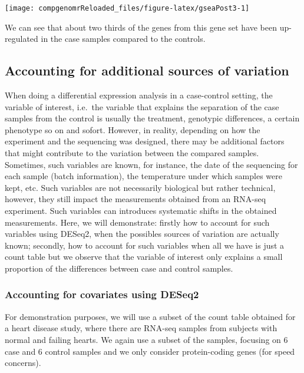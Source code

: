 \documentclass[12pt,]{krantz}
\begin{document}
\begin{center}\texttt{[image: compgenomrReloaded\_files/figure-latex/gseaPost3-1]} \end{center}

We can see that about two thirds of the genes from this gene set have been up-regulated in the case samples
compared to the controls.

\hypertarget{accounting-for-additional-sources-of-variation}{%
\subsection{Accounting for additional sources of variation}\label{accounting-for-additional-sources-of-variation}}

When doing a differential expression analysis in a case-control setting, the variable of interest, i.e.~the variable that explains the separation of the case samples from the control is usually the treatment, genotypic differences, a certain phenotype so on and sofort. However, in reality, depending on how the experiment and the sequencing was designed, there may be additional factors that might contribute to the variation between the compared samples. Sometimes, such variables are known, for instance, the date of the sequencing for each sample (batch information), the temperature under which samples were kept, etc. Such variables are not necessarily biological but rather technical, however, they still impact the measurements obtained from an RNA-seq experiment. Such variables can introduces systematic shifts in the obtained measurements. Here, we will demonstrate: firstly how to account for such variables using DESeq2, when the possibles sources of variation are actually known; secondly, how to account for such variables when all we have is just a count table but we observe that the variable of interest only explains a small proportion of the differences between case and control samples.

\hypertarget{accounting-for-covariates-using-deseq2}{%
\subsubsection{Accounting for covariates using DESeq2}\label{accounting-for-covariates-using-deseq2}}

For demonstration purposes, we will use a subset of the count table obtained for a heart disease study, where there are RNA-seq samples from subjects with normal and failing hearts. We again use a subset of the samples, focusing on 6 case and 6 control samples and we only consider protein-coding genes (for speed concerns).
\end{document}
